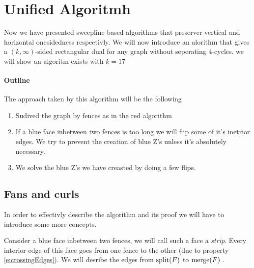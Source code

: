 
\newenvironment{invariants}{%
  \refstepcounter{thrm}%
  \paragraph{Invariants~\theprop}%
  \renewcommand*{\theenumi}{\theprop\,(I\arabic{enumi})}%
  \renewcommand*{\labelenumi}{(I\arabic{enumi})}%
  \enumerate
}{%
  \endenumerate
}

\section{Unified Algoritmh}

Now we have presented sweepline based algorithms that preserver vertical and horizontal onesidedness respectivly. We will now introduce an alorithm that gives a $(k,\infty)$-sided rectangular dual for any graph without seperating $4$-cycles. we will show an algoritm exists with $k=17$

\paragraph{Outline}
The approach taken by this algorithm will be the following
\begin{enumerate}
  \item Sudived the graph by fences as in the red algorithm
  \item If a blue face inbetween two fences is too long we will flip some of it's inetrior edges. We try to prevent the creation of blue Z's unless it's absolutely necessary.
  \item We solve the blue Z's we have creasted by doing a few flips.
\end{enumerate}


 \subsection{Fans and curls}
 In order to effectivly describe the algorithm and its proof we will have to introduce some more concepts.

 Consider a blue face inbetween two fences, we will call such a face a \emph{strip}. Every interior edge of this face goes from one fence to the other (due to property \ref{e:crossingEdges}). We will desribe the edges from $\operatorname{split}(F)$ to $\operatorname{merge}(F)$ .

